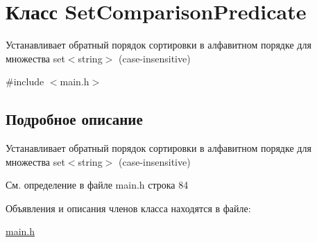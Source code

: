 \hypertarget{class_set_comparison_predicate}{\section{Класс Set\+Comparison\+Predicate}
\label{class_set_comparison_predicate}
}


Устанавливает обратный порядок сортировки в алфавитном порядке для множества set$<$string$>$ (case-\/insensitive)  




{\ttfamily \#include $<$main.\+h$>$}



\subsection{Подробное описание}
Устанавливает обратный порядок сортировки в алфавитном порядке для множества set$<$string$>$ (case-\/insensitive) 



См. определение в файле main.\+h строка 84



Объявления и описания членов класса находятся в файле\+:\begin{DoxyCompactItemize}
\item 
\hyperlink{main_8h}{main.\+h}\end{DoxyCompactItemize}
